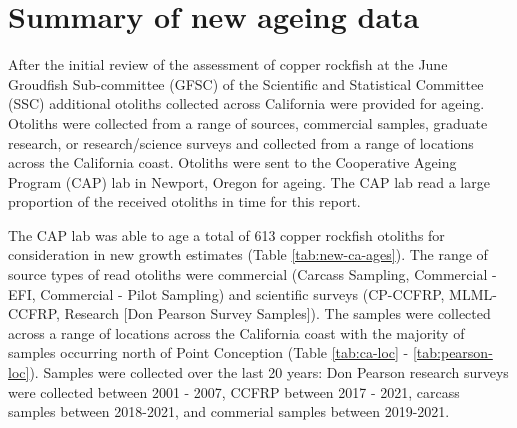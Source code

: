 \documentclass[11pt,
  english,
  a4paper,
]{article}
\begin{document}
\pagebreak
{}
\setcounter{page}{1}

\renewcommand{\thetable}{\roman{table}}
\renewcommand{\thefigure}{\roman{figure}}

\setlength\parskip{0.5em plus 0.1em minus 0.2em}

\pagebreak
\setlength{\parskip}{5mm plus1mm minus1mm}
\setcounter{page}{1}
\renewcommand{\thefigure}{\arabic{figure}}
\renewcommand{\thetable}{\arabic{table}}
\setcounter{table}{0}
\setcounter{figure}{0}

\setlength\parskip{0.2em plus 0.1em minus 0.2em}


\hypertarget{summary-of-new-ageing-data}{%
\section{Summary of new ageing data}\label{summary-of-new-ageing-data}}

\leavevmode\tagmcend\tagstructend


After the initial review of the assessment of copper rockfish at the June Groudfish Sub-committee (GFSC) of the Scientific and Statistical Committee (SSC) additional otoliths collected across California were provided for ageing. Otoliths were collected from a range of sources, commercial samples, graduate research, or research/science surveys and collected from a range of locations across the California coast. Otoliths were sent to the Cooperative Ageing Program (CAP) lab in Newport, Oregon for ageing. The CAP lab read a large proportion of the received otoliths in time for this report.

\leavevmode\tagmcend\tagstructend\par


The CAP lab was able to age a total of 613 copper rockfish otoliths for consideration in new growth estimates (Table \ref{tab:new-ca-ages}). The range of source types of read otoliths were commercial (Carcass Sampling, Commercial - EFI, Commercial - Pilot Sampling) and scientific surveys (CP-CCFRP, MLML-CCFRP, Research {[}Don Pearson Survey Samples{]}). The samples were collected across a range of locations across the California coast with the majority of samples occurring north of Point Conception (Table \ref{tab:ca-loc} - \ref{tab:pearson-loc}). Samples were collected over the last 20 years: Don Pearson research surveys were collected between 2001 - 2007, CCFRP between 2017 - 2021, carcass samples between 2018-2021, and commerial samples between 2019-2021.
\end{document}
